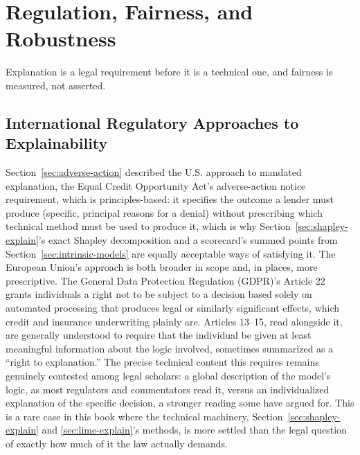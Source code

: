 \documentclass[../ai_in_finance]{subfiles}
\begin{document}
\section{Regulation, Fairness, and Robustness}

Explanation is a legal requirement before it is a technical one, and fairness is measured, not asserted.

\subsection{International Regulatory Approaches to Explainability}
\label{sec:reg-approaches}

Section~\ref{sec:adverse-action} described the U.S. approach to mandated explanation, the Equal Credit Opportunity Act's adverse-action notice requirement, which is principles-based: it specifies the outcome a lender must produce (specific, principal reasons for a denial) without prescribing which technical method must be used to produce it, which is why Section~\ref{sec:shapley-explain}'s exact Shapley decomposition and a scorecard's summed points from Section~\ref{sec:intrinsic-models} are equally acceptable ways of satisfying it. The European Union's approach is both broader in scope and, in places, more prescriptive. The General Data Protection Regulation (GDPR)'s Article 22 grants individuals a right not to be subject to a decision based solely on automated processing that produces legal or similarly significant effects, which credit and insurance underwriting plainly are. Articles 13--15, read alongside it, are generally understood to require that the individual be given at least meaningful information about the logic involved, sometimes summarized as a ``right to explanation.'' The precise technical content this requires remains genuinely contested among legal scholars: a global description of the model's logic, as most regulators and commentators read it, versus an individualized explanation of the specific decision, a stronger reading some have argued for. This is a rare case in this book where the technical machinery, Section~\ref{sec:shapley-explain} and \ref{sec:lime-explain}'s methods, is more settled than the legal question of exactly how much of it the law actually demands.
\end{document}
